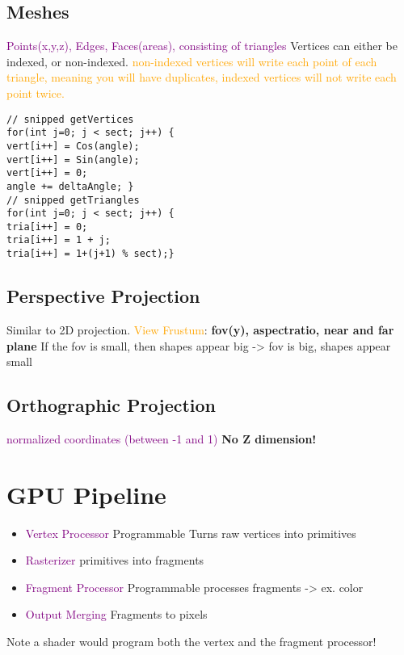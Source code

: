 \documentclass[main.tex,fontsize=12pt,paper=a4,paper=landscape,DIV=calc,]{scrartcl}
\begin{document}
\begin{multicols*}{4}
\subsection{Meshes}
\textcolor{purple}{Points(x,y,z), Edges, Faces(areas), consisting of triangles}
Vertices can either be indexed, or non-indexed.\newline
\textcolor{orange}{non-indexed vertices will write each point of each triangle, meaning you will have duplicates, indexed vertices will not write each point twice.}\newline
\begin{lstlisting}
// snipped getVertices
for(int j=0; j < sect; j++) {
vert[i++] = Cos(angle);
vert[i++] = Sin(angle);
vert[i++] = 0;
angle += deltaAngle; }
// snipped getTriangles
for(int j=0; j < sect; j++) {
tria[i++] = 0;
tria[i++] = 1 + j;
tria[i++] = 1+(j+1) % sect);}
\end{lstlisting}

\subsection{Perspective Projection}
Similar to 2D projection. \newline
\textcolor{orange}{View Frustum}: \newline
\textbf{fov(y), aspectratio, near and far plane}\newline
\textcolor{OliveGreen}{If the fov is small, then shapes appear big -> fov is big, shapes appear small}

\subsection{Orthographic Projection}
\textcolor{purple}{normalized coordinates (between -1 and 1)} \textbf{No Z dimension!}

\section{GPU Pipeline}
\begin{itemize}
\item \textcolor{purple}{Vertex Processor} Programmable\newline
  Turns raw vertices into primitives
\item \textcolor{purple}{Rasterizer} primitives into fragments
\item \textcolor{purple}{Fragment Processor} Programmable \newline
  processes fragments -> ex. color
\item \textcolor{purple}{Output Merging} Fragments to pixels
\end{itemize}
Note a shader would program both the vertex and the fragment processor!


\end{multicols*}
\end{document}
